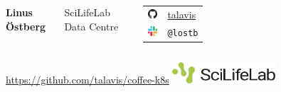 \documentclass{dcpresentation}
\newcommand\framenode[2][10pt]{
    \fill[white,path fading=fade u] (#2.south west) rectangle ($(#2.south east)+(0, #1)$);
    \fill[white,path fading=fade d] (#2.north west) rectangle ($(#2.north east)+(0,-#1)$);
    \fill[white,path fading=fade l] (#2.south east) rectangle ($(#2.north east)+(-#1,0)$);
    \fill[white,path fading=fade r] (#2.south west) rectangle ($(#2.north west)+( #1,0)$);
}
\begin{document}
 
\begin{frame}
 \begin{columns}
  {\Large \bf Linus Östberg}
  
  {\small SciLifeLab Data Centre}

  \vspace{20pt}
  
  \begin{tabular}{cl}
   \includegraphics[height=0.35cm]{img/github.pdf} & \href{https://github.com/talavis}{talavis} \\
   \includegraphics[height=0.35cm]{img/slack.pdf} & \texttt{@lostb} \\
  \end{tabular}
 \end{columns}
 
 \vspace{50pt}
 
 \begin{columns}
 {\tiny \url{https://github.com/talavis/coffee-k8s}}
  \includegraphics[height=0.8cm]{img/scilifelab-logo.pdf}
  \end{columns}
\end{frame}
\end{document}
